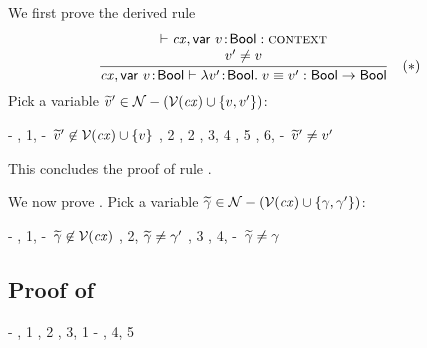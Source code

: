 We first prove the derived rule
\[
\frac{\begin{array}{c}\vdash\mathit{cx},\mathsf{var}\ v\!:\!\mathsf{Bool}:\textsc{context}\\v'\neq v\end{array}}{\mathit{cx},\mathsf{var}\ v\!:\!\mathsf{Bool}\vdash\lambda v'\!:\!\mathsf{Bool}.\;v\equiv v':\mathsf{Bool}\to\mathsf{Bool}}\quad\mbox{($\ast$)}
\]
Pick a variable $\widetilde{v}'\in\mathcal{N}-(\mathcal{V}(\mathit{cx})\cup\{v,v'\})$:
\begin{derivation}
\step{\cxwf{\snoc{\cx}{\vdec{\var}{\bool}}}}
     {\hyp}
     {\Rcxvdecbool, 1, \hyp\ $\widetilde{v}'\not\in\mathcal{V}(\mathit{cx})\cup\{v\}$}
     {\Revar, 2}
     {\Revar, 2}
     {\Reeq, 3, 4}
     {\Reabs, 5}
     {\Reabsalpha, 6, \hyp\ $\widetilde{v}'\neq v'$}
\end{derivation}
This concludes the proof of rule \RtmpI.

We now prove \Reiff.
Pick a variable $\widetilde{\gamma}\in\mathcal{N}-(\mathcal{V}(\mathit{cx})\cup\{\gamma,\gamma'\})$:
\begin{derivation}
\step{\cxwfO}
     {\hyp}
\step{\cxwf{\snoc{\cx}{\vdec{\varFX}{\bool}}}}
     {\Rcxvdecbool, 1, \hyp\ $\widetilde{\gamma}\not\in\mathcal{V}(\mathit{cx})$}
     {\RtmpI, 2, $\widetilde{\gamma}\neq\gamma'$}
     {\Reabs, 3}
     {\Reabsalpha, 4, \hyp\ $\widetilde{\gamma}\neq\gamma$}
\end{derivation}



\subsection*{Proof of }

\begin{derivation}
     {\hyp}
\step{\cxwfO}
     {, 1}
\step{\hastyO{\iiffop}{\tarr{\bool}{\tarr{\bool}{\bool}}}}
     {\Reiff, 2}
     {\Reapp, 3, 1}
     {\hyp}
     {\Reapp, 4, 5}
\end{derivation}



